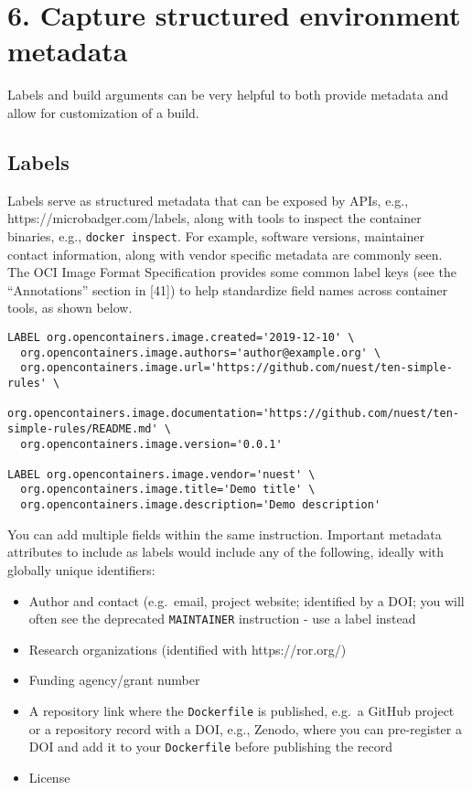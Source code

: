 \documentclass[10pt,letterpaper]{article}
\providecommand{\tightlist}{%
  \setlength{\itemsep}{0pt}\setlength{\parskip}{0pt}}
\begin{document}
\hypertarget{capture-structured-environment-metadata}{%
\section*{6. Capture structured environment
metadata}\label{capture-structured-environment-metadata}}

Labels and build arguments can be very helpful to both provide metadata
and allow for customization of a build.

\hypertarget{labels}{%
\subsection{Labels}\label{labels}}

Labels serve as structured metadata that can be exposed by APIs, e.g.,
https://microbadger.com/labels, along with tools to inspect the
container binaries, e.g., \texttt{docker\ inspect}. For example,
software versions, maintainer contact information, along with vendor
specific metadata are commonly seen. The OCI Image Format Specification
provides some common label keys (see the ``Annotations'' section in
{[}41{]}) to help standardize field names across container tools, as
shown below.

\begin{verbatim}
LABEL org.opencontainers.image.created='2019-12-10' \
  org.opencontainers.image.authors='author@example.org' \
  org.opencontainers.image.url='https://github.com/nuest/ten-simple-rules' \
  org.opencontainers.image.documentation='https://github.com/nuest/ten-simple-rules/README.md' \
  org.opencontainers.image.version='0.0.1'

LABEL org.opencontainers.image.vendor='nuest' \
  org.opencontainers.image.title='Demo title' \
  org.opencontainers.image.description='Demo description'
\end{verbatim}

You can add multiple fields within the same instruction. Important
metadata attributes to include as labels would include any of the
following, ideally with globally unique identifiers:

\begin{itemize}
\tightlist
\item
  Author and contact (e.g.~email, project website; identified by a DOI;
  you will often see the deprecated \texttt{MAINTAINER} instruction -
  use a label instead
\item
  Research organizations (identified with https://ror.org/)
\item
  Funding agency/grant number
\item
  A repository link where the \texttt{Dockerfile} is published, e.g.~a
  GitHub project or a repository record with a DOI, e.g., Zenodo, where
  you can pre-register a DOI and add it to your \texttt{Dockerfile}
  before publishing the record
\item
  License
\end{itemize}
\end{document}
